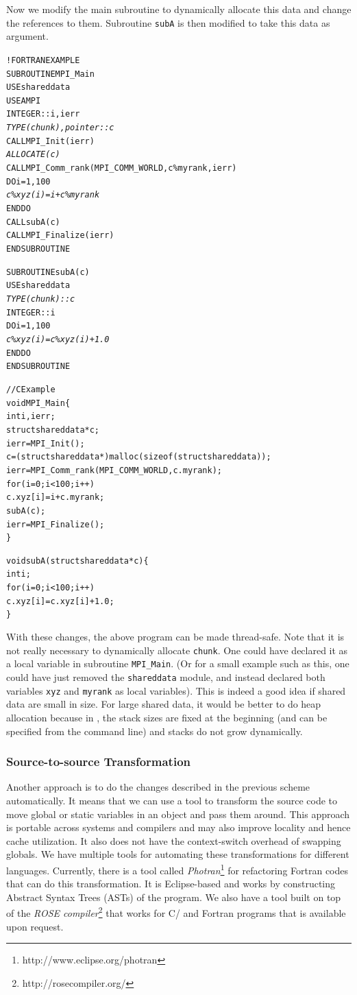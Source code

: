 \documentclass[10pt]{article}
\begin{document}
Now we modify the main subroutine to dynamically allocate this data and change the
references to them. Subroutine \texttt{subA} is then modified to take this data
as argument. 

\begin{alltt}
!FORTRAN EXAMPLE
SUBROUTINE MPI_Main
  USE shareddata
  USE AMPI
  INTEGER :: i, ierr
  \emph{TYPE(chunk), pointer :: c}
  CALL MPI_Init(ierr)
  \emph{ALLOCATE(c)}
  CALL MPI_Comm_rank(MPI_COMM_WORLD, c\%myrank, ierr)
  DO i = 1, 100
    \emph{c\%xyz(i) =  i + c\%myrank}
  END DO
  CALL subA(c)
  CALL MPI_Finalize(ierr)
END SUBROUTINE

SUBROUTINE subA(c)
  USE shareddata
  \emph{TYPE(chunk) :: c}
  INTEGER :: i
  DO i = 1, 100
    \emph{c\%xyz(i) = c\%xyz(i) + 1.0}
  END DO
END SUBROUTINE

//C Example
void MPI_Main\{
  int i,ierr;
  struct shareddata *c;
  ierr = MPI_Init();
  c = (struct shareddata*)malloc(sizeof(struct shareddata));
  ierr = MPI_Comm_rank(MPI_COMM_WORLD, c.myrank);
  for(i=0;i<100;i++)
    c.xyz[i] = i + c.myrank;
  subA(c);
  ierr = MPI_Finalize();
\}

void subA(struct shareddata *c)\{
  int i;
  for(i=0;i<100;i++)
    c.xyz[i] = c.xyz[i] + 1.0;
\}
\end{alltt}

With these changes, the above program can be made thread-safe. Note that it is
not really necessary to dynamically allocate \texttt{chunk}. One could have
declared it as a local variable in subroutine \texttt{MPI\_Main}.  (Or for a
small example such as this, one could have just removed the \texttt{shareddata}
module, and instead declared both variables \texttt{xyz} and \texttt{myrank} as
local variables). This is indeed a good idea if shared data are small in size.
For large shared data, it would be better to do heap allocation because in
\ampi{}, the stack sizes are fixed at the beginning (and can be specified from the
command line) and stacks do not grow dynamically.

\subsubsection{Source-to-source Transformation}
Another approach is to do the changes described in the previous 
scheme automatically. It means that we can use a tool to transform 
the source code to move global or static variables in an object and pass them around.
This approach is portable across systems and compilers and may also 
improve locality and hence cache utilization. It also does not have the 
context-switch overhead of swapping globals. We have multiple tools for automating 
these transformations for different languages. Currently, there is a tool 
called \emph{Photran}\footnote{http://www.eclipse.org/photran}
for refactoring Fortran codes that can do this transformation. It is Eclipse-based
and works by constructing Abstract Syntax Trees (ASTs) of the program. We
also have a tool built on top of the \emph{ROSE compiler}\footnote{http://rosecompiler.org/}
that works for C/\CC{} and Fortran programs that is available upon request.
\end{document}
